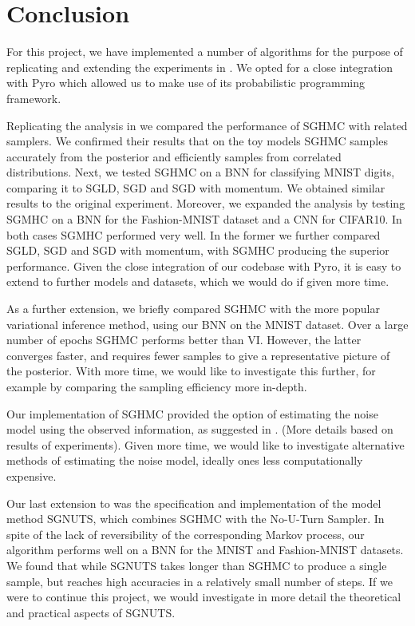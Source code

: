 
\section{Conclusion}

For this project, we have implemented a number of algorithms for the purpose of replicating and extending the experiments in \cite{sghmc}. We opted for a close integration with Pyro which allowed us to make use of its probabilistic programming framework. 

Replicating the analysis in \cite{sghmc} we compared the performance of SGHMC with related samplers. We confirmed their results that on the toy models SGHMC samples accurately from the posterior and efficiently samples from correlated distributions. Next, we tested SGHMC on a BNN for classifying MNIST digits, comparing it to SGLD, SGD and SGD with momentum. We obtained similar results to the original experiment. Moreover, we expanded the analysis by testing SGMHC on a BNN for the Fashion-MNIST dataset and a CNN for CIFAR10. In both cases SGMHC performed very well. In the former we further compared SGLD, SGD and SGD with momentum, with SGMHC producing the superior performance. Given the close integration of our codebase with Pyro, it is easy to extend to further models and datasets, which we would do if given more time.

As a further extension, we briefly compared SGHMC with the more popular variational inference method, using our BNN on the MNIST dataset. Over a large number of epochs SGHMC performs better than VI. However, the latter converges faster, and requires fewer samples to give a representative picture of the posterior. With more time, we would like to investigate this further, for example by comparing the sampling efficiency more in-depth.

Our implementation of SGHMC provided the option of estimating the noise model using the observed information, as suggested in \cite{sghmc}. (More details based on results of experiments). Given more time, we would like to investigate alternative methods of estimating the noise model, ideally ones less computationally expensive.

Our last extension to \cite{sghmc} was the specification and implementation of the model method SGNUTS, which combines SGHMC with the No-U-Turn Sampler. In spite of the lack of reversibility of the corresponding Markov process, our algorithm performs well on a BNN for the MNIST and Fashion-MNIST datasets. We found that while SGNUTS takes longer than SGHMC to produce a single sample, but reaches high accuracies in a relatively small number of steps. If we were to continue this project, we would investigate in more detail the theoretical and practical aspects of SGNUTS.